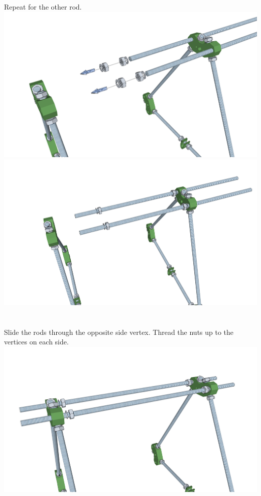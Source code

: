 \documentclass[twoside,openany,a4paper,titlepage]{memoir}
\begin{document}
	\section{}
	Repeat for the other rod.\\
	\includegraphics[width=1\linewidth]{graphics/ch4_2_1.png}
	\includegraphics[width=1\linewidth]{graphics/ch4_2_2.png}
	
	\section{}
	Slide the rods through the opposite side vertex. Thread the nuts up to the vertices on each side.\\
	\includegraphics[width=1\linewidth]{graphics/ch4_3.png}
	
\end{document}
